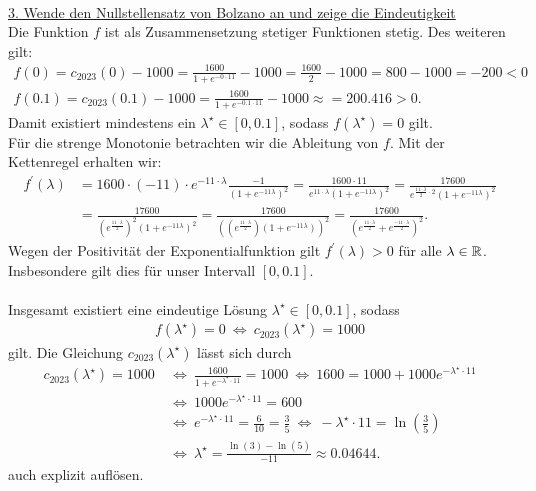 \\
\underline{3. Wende den Nullstellensatz von Bolzano an und zeige die Eindeutigkeit}\\
Die Funktion $f$ ist als Zusammensetzung stetiger Funktionen stetig. Des weiteren gilt:
\begin{align*}
	f(0) = c_{2023}(0) -1000 
	=
	\frac{1600}{1 + e^{-0 \cdot 11} } - 1000
	= 
	\frac{1600}{2} - 1000
	= 
	800 - 1000 = -200 < 0\\
	f(0.1) = c_{2023}(0.1) -1000 
	=
	\frac{1600}{1 + e^{-0.1 \cdot 11} } - 1000
	\approx
	= 
	200.416 > 0.
\end{align*}
Damit existiert mindestens ein $\lambda^\star \in [0,0.1]$, sodass $f(\lambda^\star) = 0$ gilt.\\ 
Für die strenge Monotonie betrachten wir die Ableitung von $f$. Mit der Kettenregel erhalten wir:
\begin{align*}
	f^\prime(\lambda)
	&=
	1600 \cdot (-11) \cdot e^{-11\cdot \lambda } \frac{-1}{\left(1 + e^{-11 \lambda}\right)^2}
	=
	\frac{1600 \cdot 11}{e^{11 \cdot \lambda} \left(1 + e^{-11 \lambda}\right)^2}
	=
	\frac{17600}{e^{\frac{11 \cdot \lambda}{2} \cdot 2} \left(1 + e^{-11 \lambda}\right)^2}\\
	&=
	\frac{17600}{\left(e^{\frac{11 \cdot \lambda}{2}  }\right)^2 \left(1 + e^{-11 \lambda}\right)^2}
	=
	\frac{17600}{\left(\left(e^{\frac{11 \cdot \lambda}{2}  }\right) \left(1 + e^{-11 \lambda}\right) \right)^2}
	=
	\frac{17600}{\left( e^{\frac{11 \cdot \lambda}{2}} + e^{\frac{-11 \cdot \lambda}{2}} \right)^2}.
\end{align*}
Wegen der Positivität der Exponentialfunktion gilt $f^\prime (\lambda) > 0 $ für alle $\lambda \in \mathbb{R}$. Insbesondere gilt dies für unser Intervall $[0,0.1]$.\\
\\
Insgesamt existiert eine eindeutige Lösung $\lambda^\star \in [0,0.1]$, sodass 
\begin{align*}
	f(\lambda^\star) = 0
	\ \Leftrightarrow \
	c_{2023}(\lambda^\star)  = 1000
\end{align*}
gilt. Die Gleichung $c_{2023}(\lambda^\star)$ lässt sich durch
\begin{align*}
	c_{2023}(\lambda^\star)  = 1000
	&\ \Leftrightarrow \
	\frac{1600}{1 + e^{- \lambda^\star \cdot 11}} = 1000
	\ \Leftrightarrow \
	1600 = 1000 + 1000 e^{- \lambda^\star \cdot 11}\\
	&\	\Leftrightarrow \
	1000 e^{- \lambda^\star \cdot 11} = 600\\
	&\	\Leftrightarrow \
	e^{- \lambda^\star \cdot 11} = \frac{6}{10} = \frac{3}{5}
	\ \Leftrightarrow \
	- \lambda^\star \cdot 11 = \ln \left(\frac{3}{5}\right)\\
	&\ \Leftrightarrow \
	\lambda^\star = \frac{\ln(3) - \ln(5)}{-11} \approx 0.04644.
\end{align*}
auch explizit auflösen.

